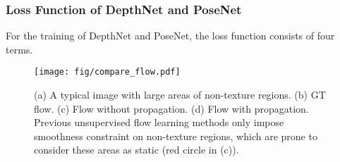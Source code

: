 \documentclass[10pt,twocolumn,letterpaper]{article}
\begin{document}
\begin{table}[htbp]
  \centering
  \renewcommand\tabcolsep{1.8pt}
  \newcommand{\tabincell}[2]{\begin{tabular}{@{}#1@{}}#2\end{tabular}}
  \label{tab:scannet1}\vspace{-1mm}
  \caption{Evaluation of depth on Scannet and KITTI datasets. K:KITTI, S:Scannet, $\dagger$:collapse, F-sup:flow supervision.}
\end{table}

\subsubsection{Loss Function of DepthNet and PoseNet}

\quad For the training of DepthNet and PoseNet, the loss function consists of four terms.

\begin{figure}[htbp]
\vspace{-3mm}
\begin{center}
  \texttt{[image: fig/compare\_flow.pdf]}
\end{center}
   \vspace{-3mm}
   \caption{(a) A typical image with large areas of non-texture regions. (b) GT flow. (c) Flow without propagation. (d) Flow with propagation. Previous unsupervised flow learning methods only impose smoothness constraint on non-texture regions, which are prone to consider these areas as static (red circle in (c)).}
\label{fig:compare_flow}
\vspace{-3mm}
\end{figure}
\end{document}
